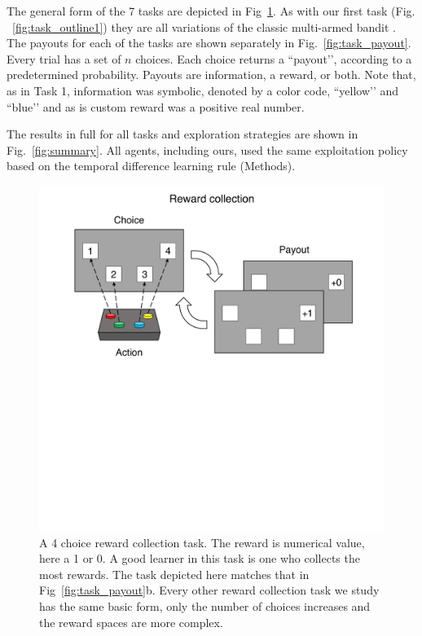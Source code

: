 The general form of the 7 tasks are depicted in Fig~\ref{fig:task_outline2}. As with our first task (Fig. ~\ref{fig:task_outline1}) they are all variations of the classic multi-armed bandit \cite{Sutton2018}. The payouts for each of the tasks are shown separately in Fig.~\ref{fig:task_payout}. Every trial has a set of $n$ choices. Each choice returns a ``payout’’, according to a predetermined probability. Payouts are information, a reward, or both. Note that, as in Task 1, information was symbolic, denoted by a color code, ``yellow’’ and ``blue’’ and as is custom reward was a positive real number. 

The results in full for all tasks and exploration strategies are shown in Fig.~\ref{fig:summary}. All agents, including ours, used the same exploitation policy based on the temporal difference learning rule \cite{Sutton2018} (Methods).

\begin{figure}
	\includegraphics[width=0.7\linewidth]{img/task_outline2.pdf} 
	\caption{A 4 choice reward collection task. The reward is numerical value, here a 1 or 0. A good learner in this task is one who collects the most rewards. The task depicted here matches that in Fig~\ref{fig:task_payout}b. Every other reward collection task we study has the same basic form, only the number of choices increases and the reward spaces are more complex.}
	\label{fig:task_outline2} 
\end{figure}

